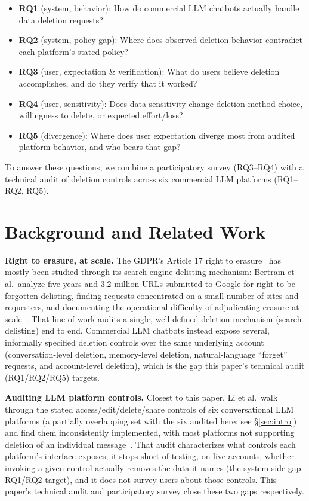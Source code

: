 \documentclass[conference,compsoc]{IEEEtran}
\begin{document}
\begin{itemize}[leftmargin=*]
\item[] \textbf{RQ1} (system, behavior): How do commercial LLM chatbots
actually handle data deletion requests?
\item[] \textbf{RQ2} (system, policy gap): Where does observed deletion
behavior contradict each platform's stated policy?
\item[] \textbf{RQ3} (user, expectation & verification): What do users
believe deletion accomplishes, and do they verify that it worked?
\item[] \textbf{RQ4} (user, sensitivity): Does data sensitivity change
deletion method choice, willingness to delete, or expected effort/loss?
\item[] \textbf{RQ5} (divergence): Where does user expectation diverge
most from audited platform behavior, and who bears that gap?
\end{itemize}

To answer these questions, we combine a participatory survey
(RQ3--RQ4) with a technical audit of deletion controls across six
commercial LLM platforms (RQ1--RQ2, RQ5).


\section{Background and Related Work}
\label{sec:background}

\textbf{Right to erasure, at scale.} The GDPR's Article 17 right to
erasure~\cite{gdpr2016} has mostly been studied through its search-engine
delisting mechanism: Bertram et al.\ analyze five years and 3.2 million
URLs submitted to Google for right-to-be-forgotten delisting, finding
requests concentrated on a small number of sites and requesters, and
documenting the operational difficulty of adjudicating erasure at
scale~\cite{bertram2019five}. That line of work audits a single,
well-defined deletion mechanism (search delisting) end to end. Commercial
LLM chatbots instead expose several, informally specified deletion
controls over the same underlying account (conversation-level deletion,
memory-level deletion, natural-language ``forget'' requests, and
account-level deletion), which is the gap this paper's technical audit
(RQ1/RQ2/RQ5) targets.

\textbf{Auditing LLM platform controls.} Closest to this paper, Li et
al.\ walk through the stated access/edit/delete/share
controls of six conversational LLM platforms (a partially overlapping
set with the six audited here; see \S\ref{sec:intro}) and find them inconsistently
implemented, with most platforms not supporting deletion of an individual
message~\cite{li2026privacy}. That audit characterizes what controls each
platform's interface exposes; it stops short of testing, on live
accounts, whether invoking a given control actually removes the data it
names (the system-side gap RQ1/RQ2 target), and it does not survey users
about those controls. This paper's technical audit and participatory
survey close these two gaps respectively.
\end{document}

